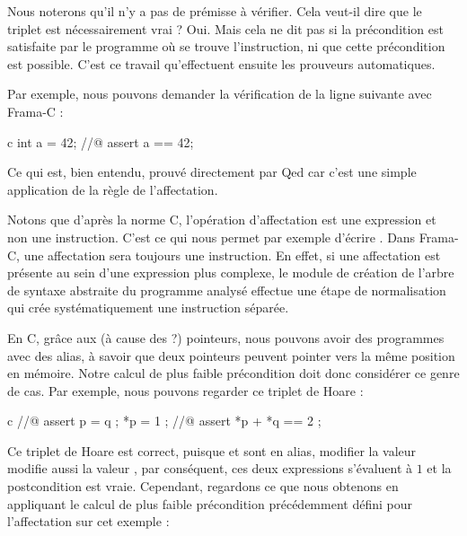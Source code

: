 Nous noterons qu'il n'y a pas de prémisse à vérifier. Cela veut-il dire que le
triplet est nécessairement vrai ? Oui. Mais cela ne dit pas si la précondition
est satisfaite par le programme où se trouve l'instruction, ni que cette
précondition est possible. C'est ce travail qu'effectuent ensuite les prouveurs
automatiques.



Par exemple, nous pouvons demander la vérification de la ligne suivante avec
Frama-C :



\begin{CodeBlock}{c}
int a = 42;
//@ assert a == 42;
\end{CodeBlock}



Ce qui est, bien entendu, prouvé directement par Qed car c'est une simple
application de la règle de l'affectation.



\begin{Information}
Notons que d'après la norme C, l'opération d'affectation est une expression
et non une instruction. C'est ce qui nous permet par exemple d'écrire
. Dans Frama-C, une affectation sera toujours une
instruction. En effet, si une affectation est présente au sein d'une
expression plus complexe, le module de création de l'arbre de syntaxe abstraite
du programme analysé effectue une étape de normalisation qui crée
systématiquement une instruction séparée.
\end{Information}





En C, grâce aux (à cause des ?) pointeurs, nous pouvons avoir des programmes avec
des alias, à savoir que deux pointeurs peuvent pointer vers la même position en
mémoire. Notre calcul de plus faible précondition doit donc considérer ce genre
de cas. Par exemple, nous pouvons regarder ce triplet de Hoare :


\begin{CodeBlock}{c}
//@ assert p = q ;
*p = 1 ;
//@ assert *p + *q == 2 ;
\end{CodeBlock}


Ce triplet de Hoare est correct, puisque  et  sont en
alias, modifier la valeur  modifie aussi la valeur ,
par conséquent, ces deux expressions s'évaluent à $1$ et la postcondition est
vraie. Cependant, regardons ce que nous obtenons en appliquant le calcul de plus
faible précondition précédemment défini pour l'affectation sur cet exemple :


